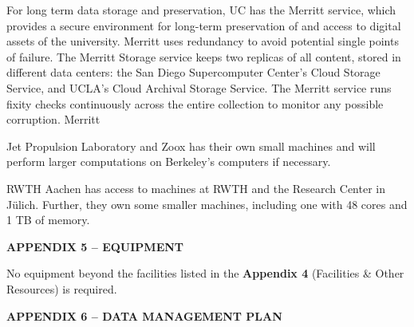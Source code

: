 \documentclass[12pt]{article}
\begin{document}
For long term data storage and preservation, UC has the Merritt service, which provides a secure environment for long-term preservation of and access to digital assets of the university.  Merritt uses redundancy to avoid potential single points of failure. The Merritt Storage service keeps two replicas of all content, stored in different data centers: the San Diego Supercomputer Center's Cloud Storage Service, and UCLA's Cloud Archival Storage Service. The Merritt service runs fixity checks continuously across the entire collection to monitor any possible corruption. Merritt 

Jet Propulsion Laboratory and Zoox has their own small machines and will perform larger computations on Berkeley's computers if necessary. 

RWTH Aachen has access to machines at RWTH and the Research Center in J\"{u}lich. Further, they own some smaller machines, including one with 48 cores and 1 TB of memory.


\pagebreak


\begin{center}
{\bf APPENDIX 5 -- EQUIPMENT}
\end{center}

No equipment beyond the facilities listed in the \textbf{Appendix 4} (Facilities \& Other Resources) is required.

\pagebreak


\begin{center}
{\bf APPENDIX 6 -- DATA MANAGEMENT PLAN}
\end{center}
\vspace{-20pt}
\end{document}
